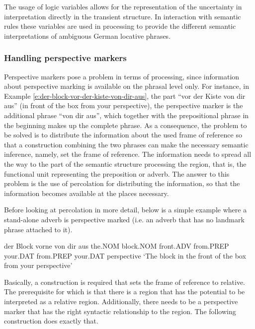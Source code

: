 The usage of logic variables allows for the representation of the 
uncertainty in interpretation directly in the transient 
structure. In interaction with semantic rules these variables are used 
in processing to provide the different semantic
interpretations of ambiguous German locative phrases.

\subsubsection*{Handling perspective markers}
Perspective markers pose a problem in terms of processing, since 
information about perspective marking 
is available on the phrasal level only. For instance, in Example 
\ref{e:der-block-vor-der-kiste-von-dir-aus}, the
part ``vor der Kiste von dir aus'' (in front of the box from your perspective), 
the perspective marker is the additional phrase ``von dir aus'', which together 
with the prepositional phrase in the beginning
makes up the complete phrase. As a consequence, the problem to be solved 
is to distribute the information about the used frame of reference so that a 
construction combining the two phrases
can make the necessary semantic inference, namely, set the frame of reference. 
The information needs to spread all the way to the part of the semantic structure 
processing the region, that is, the functional unit representing the preposition or adverb. 
The answer to this problem is the use of percolation \citep{steels2011phrasal,steels2011design} 
for distributing the information, so that the information becomes available at
the places necessary. 

Before looking at percolation in more detail, below is a simple example where a 
stand-alone adverb is perspective marked (i.e. an adverb that has no landmark 
phrase attached to it).
\begin{example}
\label{e:der-block-vorne-von-dir-aus}
\gll der Block vorne von dir aus
the.NOM block.NOM front.ADV  from.PREP your.DAT from.PREP your.DAT perspective 
\glt `The block in the front of the box from your perspective'
\glend
\end{example}
Basically, a construction is required that sets the frame of reference to relative.
The prerequisite for which is that there is a region that has the potential to be
interpreted as a relative region. Additionally, there needs to be a perspective 
marker that has the right syntactic relationship to the region.
The following construction does exactly that.

